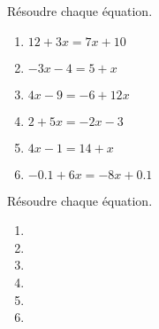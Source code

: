 \begin{exercice*}
    Résoudre chaque équation.
    \begin{multicols}{2}
        \begin{enumerate}
            \item $12+3x=7x+10$
            \item $-3x-4=5+x$
            \item $4x-9=-6+12x$
            \item $2+5x=-2x-3$
            \item $4x-1=14+x$
            \item $\num{-0.1}+6x=-8x+\num{0.1}$
        \end{enumerate}
    \end{multicols}
\end{exercice*}
\begin{corrige}
    Résoudre chaque équation.
    \begin{multicols}{2}
        \begin{enumerate}
            \item {}
            \item {}
            \item {}
            \item {}
            \item {}
            \item {}
        \end{enumerate}
    \end{multicols}    
\end{corrige}

